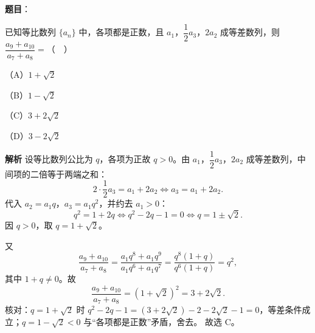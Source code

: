 \begin{answer}

\textbf{题目}：

已知等比数列 $\{a_n\}$ 中，各项都是正数，且 $a_1$，$\dfrac12a_3$，$2a_2$ 成等差数列，则 $\dfrac{a_9+a_{10}}{a_7+a_8}=$（　）

（A）$1+\sqrt2$

（B）$1-\sqrt2$

（C）$3+2\sqrt2$

（D）$3-2\sqrt2$

\textbf{解析}
设等比数列公比为 $q$，各项为正故 $q>0$。由 $a_1$，$\dfrac12a_3$，$2a_2$ 成等差数列，中间项的二倍等于两端之和：
\nopagebreak[4]
\[2\cdot\frac12a_3=a_1+2a_2\iff a_3=a_1+2a_2.\]
代入 $a_2=a_1q$，$a_3=a_1q^2$，并约去 $a_1>0$：
\nopagebreak[4]
\[q^2=1+2q\iff q^2-2q-1=0\iff q=1\pm\sqrt2.\]
因 $q>0$，取 $q=1+\sqrt2$。

又
\nopagebreak[4]
\[\frac{a_9+a_{10}}{a_7+a_8}=\frac{a_1q^8+a_1q^9}{a_1q^6+a_1q^7}=\frac{q^8(1+q)}{q^6(1+q)}=q^2,\]
其中 $1+q\neq0$。故
\nopagebreak[4]
\[\frac{a_9+a_{10}}{a_7+a_8}=(1+\sqrt2)^2=3+2\sqrt2.\]
核对：$q=1+\sqrt2$ 时 $q^2-2q-1=(3+2\sqrt2)-2-2\sqrt2-1=0$，等差条件成立；$q=1-\sqrt2<0$ 与“各项都是正数”矛盾，舍去。
故选 C。


\end{answer}
